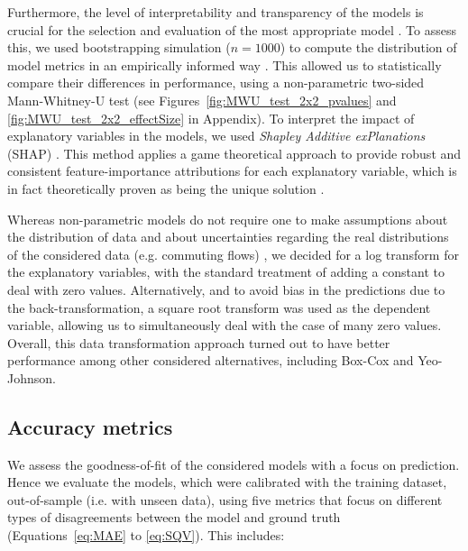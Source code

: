Furthermore, the level of interpretability and transparency of the models is crucial for the selection and evaluation of the most appropriate model \citep{Huang2023IncreasingExplanations}. To assess this, we used bootstrapping simulation ($n=1000$) to compute the distribution of model metrics in an empirically informed way \citep{DiCiccio1996BootstrapIntervals}. This allowed us to statistically compare their differences in performance, using a non-parametric two-sided Mann-Whitney-U test \citep{Mann1947} (see Figures~\ref{fig:MWU_test_2x2_pvalues} and \ref{fig:MWU_test_2x2_effectSize} in Appendix). To interpret the impact of explanatory variables in the models, we used \emph{Shapley Additive exPlanations} (SHAP) \citep{Lundberg2017APredictions}. This method applies a game theoretical approach \citep{Strumbelj2014ExplainingContributions} to provide robust and consistent feature-importance attributions for each explanatory variable, which is in fact theoretically proven as being the unique solution \citep{Fujimoto2006AxiomaticIndices}.

Whereas non-parametric models do not require one to make assumptions about the distribution of data and about uncertainties regarding the real distributions of the considered data (e.g. commuting flows) \citep{Farmer2011CommutingTravel-to-work}, we decided for a log transform for the explanatory variables, with the standard treatment of adding a constant to deal with zero values. Alternatively, and to avoid bias in the predictions due to the back-transformation, a square root transform was used as the dependent variable, allowing us to simultaneously deal with the case of many zero values. Overall, this data transformation approach turned out to have better performance among other considered alternatives, including Box-Cox and Yeo-Johnson.

\subsection{Accuracy metrics}
\label{subsec:ETRCO2H_accuracy_metrics}

We assess the goodness-of-fit of the considered models with a focus on prediction. Hence we evaluate the models, which were calibrated with the training dataset, out-of-sample (i.e. with unseen data), %
using five metrics that focus on different types of disagreements between the model and ground truth (Equations~\ref{eq:MAE} to \ref{eq:SQV}). This includes: 

